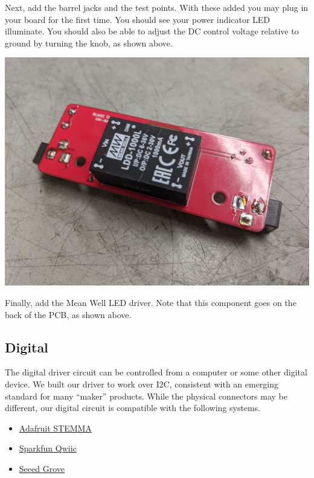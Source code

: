 \documentclass[11pt]{article}
\begin{document}
Next, add the barrel jacks and the test points.
With these added you may plug in your board for the first time.
You should see your power indicator LED illuminate.
You should also be able to adjust the DC control voltage relative to ground by turning the knob, as shown above.

\begin{center}
  \includegraphics[width=\textwidth/2]{"./pcb-driver.jpg"}
\end{center}

Finally, add the Mean Well LED driver.
Note that this component goes on the back of the PCB, as shown above.



\subsection{Digital} \label{SEC:digital-driver}

The digital driver circuit can be controlled from a computer or some other digital device.
We built our driver to work over I2C, consistent with an emerging standard for many ``maker'' products.
While the physical connectors may be different, our digital circuit is compatible with the following systems.

\begin{itemize}
  \item \href{https://learn.adafruit.com/introducing-adafruit-stemma-qt}{Adafruit STEMMA}
  \item \href{https://www.sparkfun.com/qwiic}{Sparkfun Qwiic}
  \item \href{https://www.seeedstudio.com/category/Grove-c-1003.html}{Seeed Grove}
\end{itemize}
\end{document}

